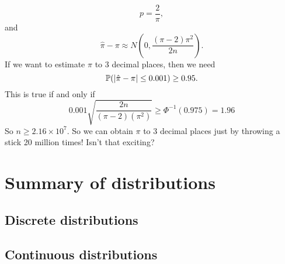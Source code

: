 \begin{note}
\begin{field}
\begin{eg}
      \[
        p = \frac{2}{\pi},
      \]
      and
      \[
        \hat \pi - \pi \approx N\left(0, \frac{(\pi - 2)\pi^2}{2n}\right).
      \]
      If we want to estimate $\pi$ to 3 decimal places, then we need
      \[
        \P(|\hat \pi - \pi| \leq 0.001) \geq 0.95.
      \]
      This is true if and only if
      \[
        0.001\sqrt{\frac{2n}{(\pi - 2)(\pi^2)}} \geq \Phi^{-1}(0.975) = 1.96
      \]
      So $n\geq 2.16 \times 10^7$. So we can obtain $\pi$ to 3 decimal places just by throwing a stick 20 million times! Isn't that exciting?
    \end{eg}
  \end{field}
  \xplain{}%
\end{note}

\section{Summary of distributions}

\subsection{Discrete distributions}

\subsection{Continuous distributions}

